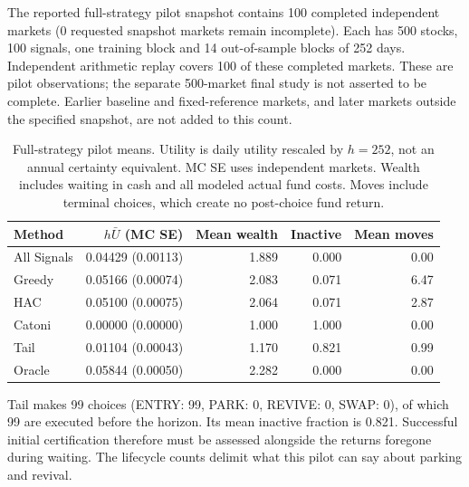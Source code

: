 The reported full-strategy pilot snapshot contains 100 completed independent markets (0 requested snapshot markets remain incomplete). Each has 500 stocks, 100 signals, one training block and 14 out-of-sample blocks of 252 days. Independent arithmetic replay covers 100 of these completed markets. These are pilot observations; the separate 500-market final study is not asserted to be complete. Earlier baseline and fixed-reference markets, and later markets outside the specified snapshot, are not added to this count.

\begin{table}[H]\centering\small

\begin{tabular}{lrrrr}

\toprule

Method & $h\bar U$ (MC SE) & Mean wealth & Inactive & Mean moves \\

\midrule

All Signals & 0.04429 (0.00113) & 1.889 & 0.000 & 0.00 \\

Greedy & 0.05166 (0.00074) & 2.083 & 0.071 & 6.47 \\

HAC & 0.05100 (0.00075) & 2.064 & 0.071 & 2.87 \\

Catoni & 0.00000 (0.00000) & 1.000 & 1.000 & 0.00 \\

Tail & 0.01104 (0.00043) & 1.170 & 0.821 & 0.99 \\

Oracle & 0.05844 (0.00050) & 2.282 & 0.000 & 0.00 \\

\bottomrule\end{tabular}

\caption{Full-strategy pilot means. Utility is daily utility rescaled by $h=252$, not an annual certainty equivalent. MC SE uses independent markets. Wealth includes waiting in cash and all modeled actual fund costs. Moves include terminal choices, which create no post-choice fund return.}\end{table}

Tail makes 99 choices (ENTRY: 99, PARK: 0, REVIVE: 0, SWAP: 0), of which 99 are executed before the horizon. Its mean inactive fraction is 0.821. Successful initial certification therefore must be assessed alongside the returns foregone during waiting. The lifecycle counts delimit what this pilot can say about parking and revival.

